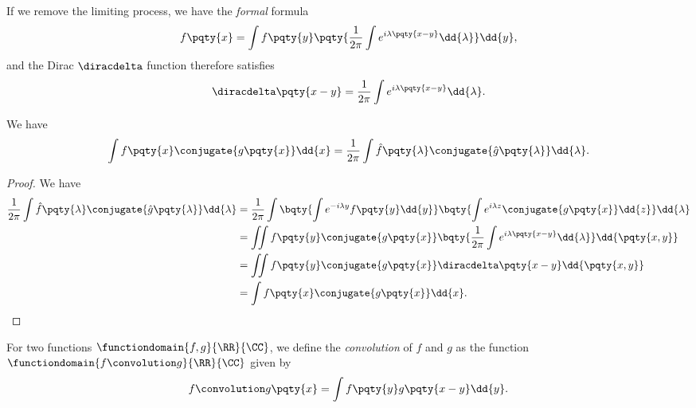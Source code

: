 If we remove the limiting process, we have the \emph{formal} formula
\begin{equation}
    f\pqty{x} = \int f\pqty{y} \pqty{\frac{1}{2\pi} \int e^{i \lambda \pqty{x - y}} \dd{\lambda}} \dd{y},
\end{equation}
and the Dirac \(\diracdelta\) function therefore satisfies
\begin{equation}
    \label{eq:dirac-delta-fourier}%
    \diracdelta\pqty{x - y} = \frac{1}{2\pi} \int e^{i \lambda \pqty{x - y}} \dd{\lambda}.
\end{equation}

\begin{proposition}
    \label{prop:parsevals-theorem-fourier-transform}%
    We have
    \begin{equation}
        \int f\pqty{x} \conjugate{g\pqty{x}} \dd{x} = \frac{1}{2\pi} \int \hat{f}\pqty{\lambda} \conjugate{\hat{g}\pqty{\lambda}} \dd{\lambda}.
    \end{equation}
\end{proposition}

\begin{proof}
    We have
    \begin{subequations}
        \begin{align}
            \frac{1}{2\pi} \int \hat{f}\pqty{\lambda} \conjugate{\hat{g}\pqty{\lambda}} \dd{\lambda} &= \frac{1}{2\pi} \int \bqty{\int e^{-i \lambda y} f\pqty{y} \dd{y}} \bqty{\int e^{i \lambda z} \conjugate{g\pqty{x}} \dd{z}} \dd{\lambda} \\
            &= \iint f\pqty{y} \conjugate{g\pqty{x}} \bqty{\frac{1}{2\pi} \int e^{i \lambda \pqty{x - y}} \dd{\lambda}} \dd{\pqty{x, y}} \\
            &= \iint f\pqty{y} \conjugate{g\pqty{x}} \diracdelta\pqty{x - y} \dd{\pqty{x, y}} \\
            &= \int f\pqty{x} \conjugate{g\pqty{x}} \dd{x}.
        \end{align}
    \end{subequations}
\end{proof}

\begin{definition}
    For two functions \(\functiondomain{f, g}{\RR}{\CC}\), we define the \emph{convolution} of \(f\) and \(g\) as the function \(\functiondomain{f \convolution g}{\RR}{\CC}\) given by
    \begin{equation}
        f \convolution g\pqty{x} = \int f\pqty{y} g\pqty{x - y} \dd{y}.
    \end{equation}
\end{definition}


